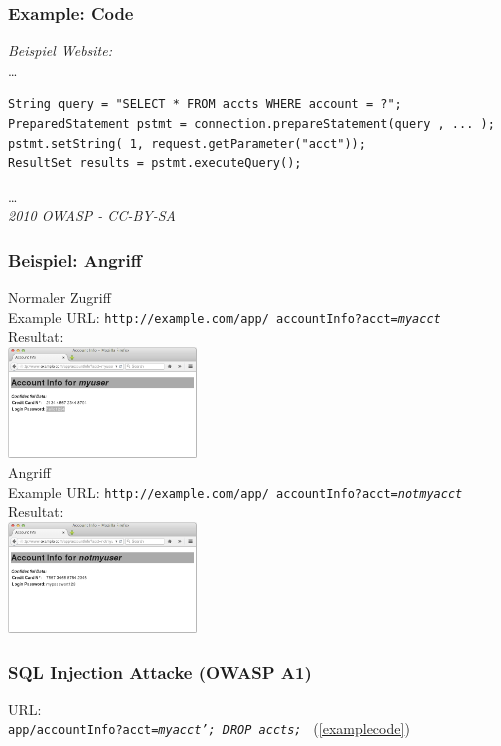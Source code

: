 \documentclass[aspectratio=169]{beamer}
\begin{document}
\begin{frame}[fragile]
  \label{examplecode}
  \frametitle{Example: Code}
  \textit{Beispiel Website:}\\\tiny
\dots
\begin{verbatim}
String query = "SELECT * FROM accts WHERE account = ?";
PreparedStatement pstmt = connection.prepareStatement(query , ... );
pstmt.setString( 1, request.getParameter("acct"));
ResultSet results = pstmt.executeQuery();
\end{verbatim}
\dots\\
\tiny\textit{2010 OWASP - CC-BY-SA}
\normalsize
\end{frame}


\begin{frame}
  \frametitle{Beispiel: Angriff}
  \begin{multicols}{2}
   \LARGE{Normaler Zugriff}\\\normalsize Example URL: \small\texttt{http://example.com/app/ accountInfo?acct=\textit{myacct}}\\
   \normalsize{Resultat:}\\\includegraphics[width=5cm]{example_web_s1}\\
   \LARGE{Angriff}\\\normalsize Example URL: \small\texttt{http://example.com/app/ accountInfo?acct=\textit{notmyacct}}\\
   \normalsize{Resultat:}\\\includegraphics[width=5cm]{example_web_s2}\\
  \end{multicols}
\end{frame}

\begin{frame}
  \frametitle{SQL Injection Attacke (OWASP A1)}
  URL:\\ \texttt{app/accountInfo?acct=\textit{myacct'; DROP accts; }} (\ref{examplecode})
\end{frame}
\end{document}
